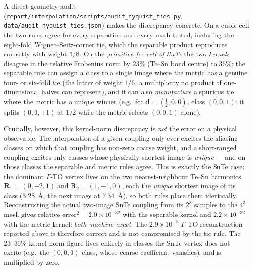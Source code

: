 \documentclass[11pt,a4paper]{article}
\begin{document}
A direct geometry audit
(\texttt{report/interpolation/scripts/audit\_nyquist\_ties.py},
\texttt{data/audit\_nyquist\_ties.json}) makes the discrepancy concrete.
On a cubic cell the two rules agree for every separation and every mesh
tested, including the eight-fold Wigner--Seitz-corner tie, which the
separable product reproduces correctly with weight $1/8$.  On the
\emph{primitive fcc cell of SnTe} the two \emph{kernels} disagree in the
relative Frobenius norm by $23\%$ (Te--Sn bond centre) to $36\%$; the
separable rule can assign a class to a single image where the metric has a
genuine four- or six-fold tie (the latter of weight $1/6$, a multiplicity
no product of one-dimensional halves can represent), and it can also
\emph{manufacture} a spurious tie where the metric has a unique winner
(e.g.\ fcc $\mathbf d=(\tfrac12,0,0)$, class $(0,0,1)$: it splits
$(0,0,\pm1)$ at $1/2$ while the metric selects $(0,0,1)$ alone).

Crucially, however, this kernel-norm discrepancy is \emph{not} the error on
a physical observable.  The interpolation of a given coupling only ever
excites the aliasing classes on which that coupling has non-zero coarse
weight, and a short-ranged coupling excites only classes whose physically
shortest image is \emph{unique} --- and on those classes the separable and
metric rules agree.  This is exactly the SnTe case: the dominant
$\Gamma$-TO vertex lives on the two nearest-neighbour Te--Sn harmonics
$\mathbf R_1=(0,-2,1)$ and $\mathbf R_2=(1,-1,0)$, each the \emph{unique}
shortest image of its class ($3.28$~\AA, the next image at $7.34$~\AA), so
both rules place them identically.  Reconstructing the actual two-image
SnTe coupling from its $2^3$ samples to the $4^3$ mesh gives relative
error$^2=2.0\times10^{-32}$ with the separable kernel and
$2.2\times10^{-32}$ with the metric kernel: \emph{both machine-exact}.  The
$2.9\times10^{-5}$ $\Gamma$-TO reconstruction reported above is therefore
correct and is not compromised by the tie rule.  The $23$--$36\%$
kernel-norm figure lives entirely in classes the SnTe vertex does not
excite (e.g.\ the $(0,0,0)$ class, whose coarse coefficient vanishes), and
is multiplied by zero.
\end{document}
